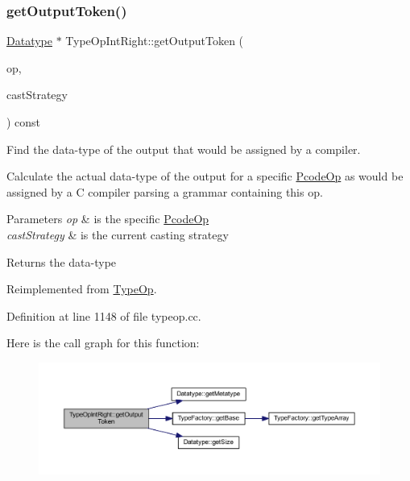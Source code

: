 \subsubsection{\texorpdfstring{getOutputToken()}{getOutputToken()}}
{\footnotesize\ttfamily \mbox{\hyperlink{class_datatype}{Datatype}} $\ast$ Type\+Op\+Int\+Right\+::get\+Output\+Token (\begin{DoxyParamCaption}\item[{const \mbox{\hyperlink{class_pcode_op}{Pcode\+Op}} $\ast$}]{op,  }\item[{\mbox{\hyperlink{class_cast_strategy}{Cast\+Strategy}} $\ast$}]{cast\+Strategy }\end{DoxyParamCaption}) const\hspace{0.3cm}{\ttfamily [virtual]}}



Find the data-\/type of the output that would be assigned by a compiler. 

Calculate the actual data-\/type of the output for a specific \mbox{\hyperlink{class_pcode_op}{Pcode\+Op}} as would be assigned by a C compiler parsing a grammar containing this op. 
\begin{DoxyParams}{Parameters}
{\em op} & is the specific \mbox{\hyperlink{class_pcode_op}{Pcode\+Op}} \\
\hline
{\em cast\+Strategy} & is the current casting strategy \\
\hline
\end{DoxyParams}
\begin{DoxyReturn}{Returns}
the data-\/type 
\end{DoxyReturn}


Reimplemented from \mbox{\hyperlink{class_type_op_a7150ac93bb03a993735c829deb5237e7}{Type\+Op}}.



Definition at line 1148 of file typeop.\+cc.

Here is the call graph for this function\+:
\nopagebreak
\begin{figure}[H]
\begin{center}
\leavevmode
\includegraphics[width=350pt]{class_type_op_int_right_a3c470ddca0dbdab3b01d8734308edd26_cgraph}
\end{center}
\end{figure}
\mbox{\label{class_type_op_int_right_ad559bbd46ae7088009581400e81fa467}} 
